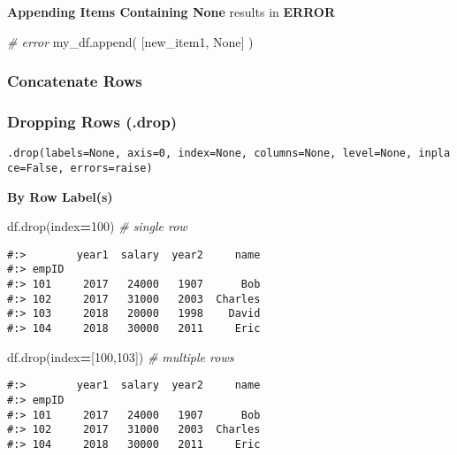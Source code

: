 \documentclass[
]{book}
\newenvironment{Shaded}{\begin{snugshade}}{\end{snugshade}}
\newcommand{\CommentTok}[1]{\textcolor[rgb]{0.37,0.37,0.37}{\textit{#1}}}
\newcommand{\DecValTok}[1]{\textcolor[rgb]{0.06,0.06,0.06}{#1}}
\newcommand{\NormalTok}[1]{#1}
\newcommand{\OperatorTok}[1]{\textcolor[rgb]{0.43,0.43,0.43}{\textbf{#1}}}
\newcommand{\VariableTok}[1]{\textcolor[rgb]{0,0,0}{#1}}
\begin{document}
\textbf{Appending Items Containing None} results in \textbf{ERROR}

\begin{Shaded}
\begin{Highlighting}[]
\CommentTok{\# error}
\NormalTok{my\_df.append( [new\_item1, }\VariableTok{None}\NormalTok{] )}
\end{Highlighting}
\end{Shaded}

\hypertarget{concatenate-rows}{%
\subsubsection{Concatenate Rows}\label{concatenate-rows}}

\hypertarget{dropping-rows-.drop}{%
\subsubsection{Dropping Rows (.drop)}\label{dropping-rows-.drop}}

\texttt{.drop(labels=None,\ axis=0,\ index=None,\ columns=None,\ level=None,\ inplace=False,\ errors=\textquotesingle{}raise\textquotesingle{})}

\textbf{By Row Label(s)}

\begin{Shaded}
\begin{Highlighting}[]
\NormalTok{df.drop(index}\OperatorTok{=}\DecValTok{100}\NormalTok{)       }\CommentTok{\# single row}
\end{Highlighting}
\end{Shaded}

\begin{verbatim}
#:>        year1  salary  year2     name
#:> empID                               
#:> 101     2017   24000   1907      Bob
#:> 102     2017   31000   2003  Charles
#:> 103     2018   20000   1998    David
#:> 104     2018   30000   2011     Eric
\end{verbatim}

\begin{Shaded}
\begin{Highlighting}[]
\NormalTok{df.drop(index}\OperatorTok{=}\NormalTok{[}\DecValTok{100}\NormalTok{,}\DecValTok{103}\NormalTok{])   }\CommentTok{\# multiple rows}
\end{Highlighting}
\end{Shaded}

\begin{verbatim}
#:>        year1  salary  year2     name
#:> empID                               
#:> 101     2017   24000   1907      Bob
#:> 102     2017   31000   2003  Charles
#:> 104     2018   30000   2011     Eric
\end{verbatim}
\end{document}
